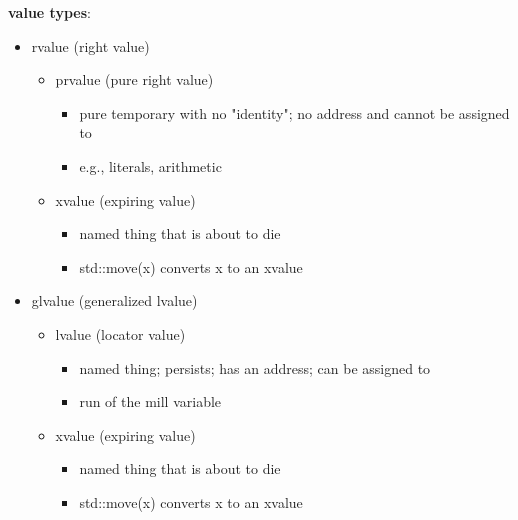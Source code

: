 \documentclass{article}
\begin{document}
\begin{multicols}{2}
\noindent
\textbf{value types}:
\vspace{-.7\baselineskip}
\begin{itemize}
    \item rvalue (right value)
    \vspace{-.7\baselineskip}
        \begin{itemize}
            \item prvalue (pure right value)
                \begin{itemize}
                    \item pure temporary with no "identity"; no address and cannot be assigned to
                    \item e.g., literals, arithmetic
                \end{itemize}
            \item xvalue (expiring value)
                \begin{itemize}
                    \item named thing that is about to die
                    \item std::move(x) converts x to an xvalue
                \end{itemize}
        \end{itemize}
    \vspace{-\baselineskip}
    \item glvalue (generalized lvalue)
    \vspace{-.7\baselineskip}
        \begin{itemize}
            \item lvalue (locator value)
                \begin{itemize}
                    \item named thing; persists; has an address; can be assigned to
                    \item run of the mill variable
                \end{itemize}
            \item xvalue (expiring value)
                \begin{itemize}
                    \item named thing that is about to die
                    \item std::move(x) converts x to an xvalue
                \end{itemize}
        \end{itemize}
\end{itemize}
\end{multicols}
\end{document}
